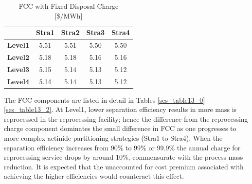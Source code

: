 \begin{table}[htbp]
\begin{center}
\caption{FCC with Fixed Disposal Charge [\$/MWh]}
\label{ses_table12}
\begin{tabular}{|l|c|c|c|c|}
\hline
                & \textbf{Stra1} & \textbf{Stra2} & \textbf{Stra3} & \textbf{Stra4} \\
\hline
\textbf{Level1} & 5.51           & 5.51           & 5.50           & 5.50 \\
\textbf{Level2} & 5.18           & 5.18           & 5.16           & 5.16 \\
\textbf{Level3} & 5.15           & 5.14           & 5.13           & 5.12 \\
\textbf{Level4} & 5.14           & 5.14           & 5.13           & 5.12 \\
\hline
\end{tabular}
\end{center}
\end{table}



The FCC components are listed in detail in Tables \ref{ses_table13_0}-\ref{ses_table13_2}. At Level1, lower
separation efficiency results in more mass is reprocessed in the
reprocessing facility; hence the difference from the reprocessing charge
component dominates the small difference in FCC as one progresses to
more complex actinide partitioning strategies (Stra1 to Stra4).  When
the separation efficiency increases from 90\% to 99\% or 99.9\% the
annual charge for reprocessing service drops by around 10\%,
commensurate with the process mass reduction.  It is expected that the
unaccounted for cost premium associated with achieving the higher
efficiencies would counteract this effect.  


